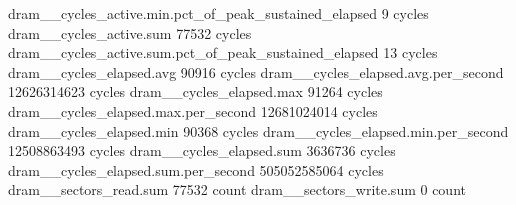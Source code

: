 dram__cycles_active.min.pct_of_peak_sustained_elapsed                                          9 cycles
dram__cycles_active.sum                                                                    77532 cycles
dram__cycles_active.sum.pct_of_peak_sustained_elapsed                                         13 cycles
dram__cycles_elapsed.avg                                                                   90916 cycles
dram__cycles_elapsed.avg.per_second                                                  12626314623 cycles
dram__cycles_elapsed.max                                                                   91264 cycles
dram__cycles_elapsed.max.per_second                                                  12681024014 cycles
dram__cycles_elapsed.min                                                                   90368 cycles
dram__cycles_elapsed.min.per_second                                                  12508863493 cycles
dram__cycles_elapsed.sum                                                                 3636736 cycles
dram__cycles_elapsed.sum.per_second                                                 505052585064 cycles
dram__sectors_read.sum                                                                     77532 count
dram__sectors_write.sum                                                                        0 count

